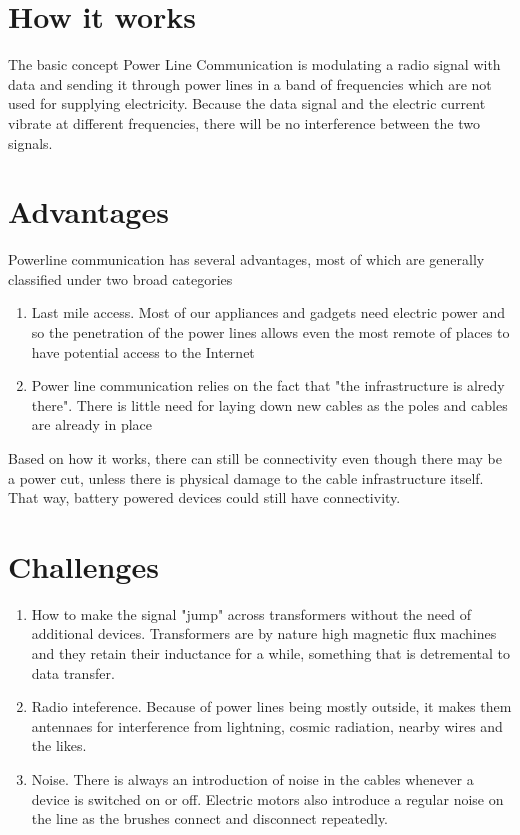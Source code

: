 \documentclass[11pt]{article}
\begin{document}
\begin{multicols}{2}
\section*{How it works}
The basic concept Power Line Communication is modulating a radio signal with data and sending it through power lines in a band of frequencies which are not used for supplying electricity. Because the data signal and the electric current vibrate at different frequencies, there will be no interference between the two signals.

\section*{Advantages}
Powerline communication has several advantages, most of which are generally classified under two broad categories
\begin{enumerate}
\item Last mile access. Most of our appliances and gadgets need electric power and so the penetration of the power lines allows even the most remote of places to have potential access to the Internet
\item Power line communication relies on the fact that "the infrastructure is alredy there". There is little need for laying down new cables as the poles and cables are already in place
\end{enumerate}
Based on how it works, there can still be connectivity even though there may be a power cut, unless there is physical damage to the cable infrastructure itself. That way, battery powered devices could still have connectivity.

\section*{Challenges}
\begin{enumerate}
\item How to make the signal "jump" across transformers without the need of additional devices. Transformers are by nature high magnetic flux machines and they retain their inductance for a while, something that is detremental to data transfer.
\item Radio inteference. Because of power lines being mostly outside, it makes them antennaes for interference from lightning, cosmic radiation, nearby wires and the likes.
\item Noise. There is always an introduction of noise in the cables whenever a device is switched on or off. Electric motors also introduce a regular noise on the line as the brushes connect and disconnect repeatedly.
\end{enumerate}


\end{multicols}
\end{document}
